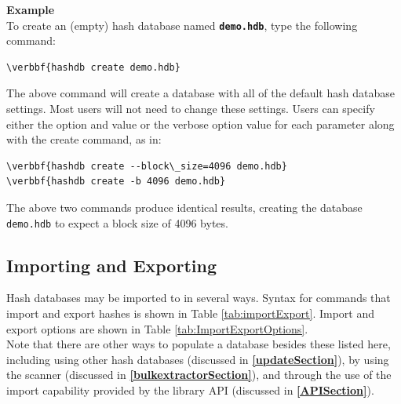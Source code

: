 \documentclass[11pt,fleqn]{article} %
\begin{document}
\textbf{Example}\\
To create an (empty) hash database named \textbf{\texttt{demo.hdb}}, type the following command:
\begin{Verbatim}[commandchars=\\\{\}]
\verbbf{hashdb create demo.hdb}
\end{Verbatim}
The above command will create a database with all of the default hash database settings. Most users will not need to change these settings.
Users can specify either the option and value or the verbose option value for each parameter along with the create command, as in:\\
\begin{Verbatim}[commandchars=\\\{\}]
\verbbf{hashdb create --block\_size=4096 demo.hdb}
\verbbf{hashdb create -b 4096 demo.hdb}
\end{Verbatim}
The above two commands produce identical results, creating the database \texttt{demo.hdb} to expect a block size of 4096 bytes.\\

\subsection{Importing and Exporting}
Hash databases may be imported to in several ways.  Syntax for commands that import and export hashes is shown in Table \ref{tab:importExport}. Import and export options are shown in Table \ref{tab:ImportExportOptions}.\\

Note that there are other ways to populate a database besides these listed here, including using other hash databases (discussed in \textbf{\autoref{updateSection}}),
by using the \bulk \hdb scanner (discussed in \textbf{\autoref{bulkextractorSection}}),
and through the use of the import capability provided by the \hdb library API (discussed in \textbf{\autoref{APISection}}).\\
\end{document}

